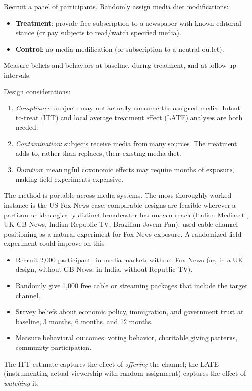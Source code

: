 \begin{model}
\label{mod:media-field}
Recruit a panel of participants.
Randomly assign media diet modifications:
\begin{itemize}[nosep]
  \item \textbf{Treatment}: provide free subscription to a newspaper with known editorial stance (or pay subjects to read/watch specified media).
  \item \textbf{Control}: no media modification (or subscription to a neutral outlet).
\end{itemize}
Measure beliefs and behaviors at baseline, during treatment, and at follow-up intervals.

Design considerations:
\begin{enumerate}[nosep]
  \item \emph{Compliance}: subjects may not actually consume the assigned media. Intent-to-treat (ITT) and local average treatment effect (LATE) analyses are both needed.
  \item \emph{Contamination}: subjects receive media from many sources. The treatment adds to, rather than replaces, their existing media diet.
  \item \emph{Duration}: meaningful doxonomic effects may require months of exposure, making field experiments expensive.
\end{enumerate}
\end{model}

\begin{example}
\label{ex:media-field}
The method is portable across media systems. The most thoroughly worked instance is the US Fox News case; comparable designs are feasible wherever a partisan or ideologically-distinct broadcaster has uneven reach (Italian Mediaset \autocite{durante2019}, UK GB News, Indian Republic TV, Brazilian Jovem Pan).
\textcite{dellavigna2007} used cable channel positioning as a natural experiment for Fox News exposure.
A randomized field experiment could improve on this:
\begin{itemize}[nosep]
  \item Recruit 2,000 participants in media markets without Fox News (or, in a UK design, without GB News; in India, without Republic TV).
  \item Randomly give 1,000 free cable or streaming packages that include the target channel.
  \item Survey beliefs about economic policy, immigration, and government trust at baseline, 3 months, 6 months, and 12 months.
  \item Measure behavioral outcomes: voting behavior, charitable giving patterns, community participation.
\end{itemize}
The ITT estimate captures the effect of \emph{offering} the channel; the LATE (instrumenting actual viewership with random assignment) captures the effect of \emph{watching} it.
\end{example}

